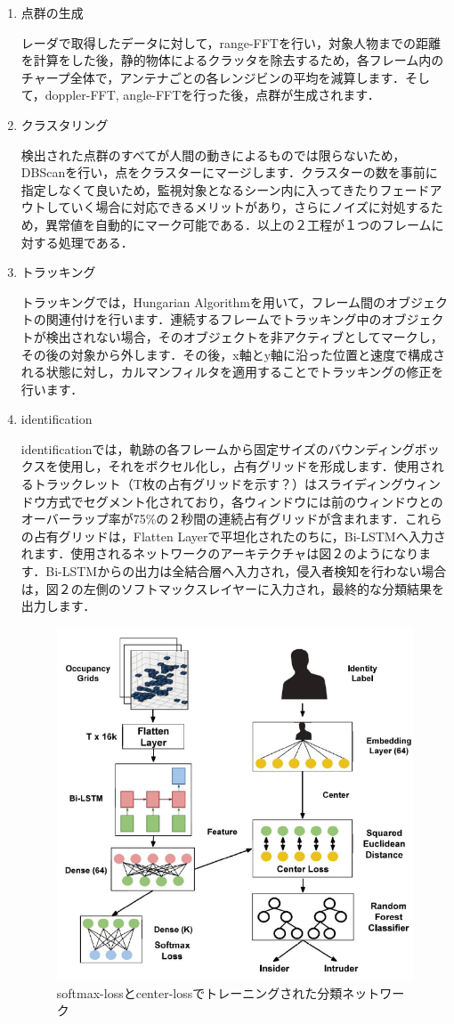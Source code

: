 \documentclass[dvipdfmx]{jsarticle}
\begin{document}
\begin{enumerate}
    \item 点群の生成

レーダで取得したデータに対して，range-FFTを行い，対象人物までの距離を計算をした後，静的物体によるクラッタを除去するため，各フレーム内のチャープ全体で，アンテナごとの各レンジビンの平均を減算します．そして，doppler-FFT, angle-FFTを行った後，点群が生成されます．
    \item クラスタリング
    
検出された点群のすべてが人間の動きによるものでは限らないため，DBScanを行い，点をクラスターにマージします．クラスターの数を事前に指定しなくて良いため，監視対象となるシーン内に入ってきたりフェードアウトしていく場合に対応できるメリットがあり，さらにノイズに対処するため，異常値を自動的にマーク可能である．以上の２工程が１つのフレームに対する処理である．
    \item トラッキング
    
トラッキングでは，Hungarian Algorithmを用いて，フレーム間のオブジェクトの関連付けを行います．連続するフレームでトラッキング中のオブジェクトが検出されない場合，そのオブジェクトを非アクティブとしてマークし，その後の対象から外します．その後，x軸とy軸に沿った位置と速度で構成される状態に対し，カルマンフィルタを適用することでトラッキングの修正を行います．
    \item identification
    
identificationでは，軌跡の各フレームから固定サイズのバウンディングボックスを使用し，それをボクセル化し，占有グリッドを形成します．使用されるトラックレット（T枚の占有グリッドを示す？）はスライディングウィンドウ方式でセグメント化されており，各ウィンドウには前のウィンドウとのオーバーラップ率が75\%の２秒間の連続占有グリッドが含まれます．これらの占有グリッドは，Flatten Layerで平坦化されたのちに，Bi-LSTMへ入力されます．使用されるネットワークのアーキテクチャは図２のようになります．Bi-LSTMからの出力は全結合層へ入力され，侵入者検知を行わない場合は，図２の左側のソフトマックスレイヤーに入力され，最終的な分類結果を出力します．

\begin{figure}[H]
    \begin{center}
    \includegraphics[width=0.6\linewidth]{./img/network_architecture.png}
    \end{center}
    \caption{softmax-lossとcenter-lossでトレーニングされた分類ネットワーク}
\end{figure}


\end{enumerate}
\end{document}
